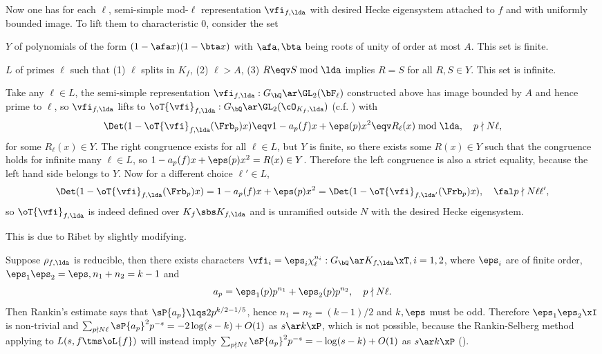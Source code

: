 \documentclass[article, a4paper, twoside]{universal}
\begin{document}
\begin{prf}
	Now one has for each $\ell$, semi-simple mod-$\ell$ representation $\vfi_{f,\lda}$ with desired Hecke eigensystem attached to $f$ and with uniformly bounded image. To lift them to characteristic $0$, consider the set
	\begin{itm}
		\item $Y$ of polynomials of the form $(1-\afa x)(1-\bta x)$ with $\afa,\bta$ being roots of unity of order at most $A$. This set is finite.
		\item $L$ of primes $\ell$ such that (1) $\ell$ splits in $K_{f}$, (2) $\ell>A$, (3) $R\eqv S\bmod{\lda}$ implies $R=S$ for all $R,S\in Y$. This set is infinite.
	\end{itm}
	Take any $\ell\in L$, the semi-simple representation $\vfi_{f,\lda}:G_{\bQ}\ar\GL_{2}(\bF_{\ell})$ constructed above has image bounded by $A$ and hence prime to $\ell$, so $\vfi_{f,\lda}$ lifts to $\oT{\vfi}_{f,\lda}:G_{\bQ}\ar\GL_{2}(\cO_{K_{f},\lda})$ (c.f. \cite[4.4]{Feit1967}) with
	\[
		\Det(1-\oT{\vfi}_{f,\lda}(\Frb_{p})x)\eqv1-a_{p}(f)x+\eps(p)x^{2}\eqv R_{\ell}(x)\bmod{\lda},\quad p\nmid N\ell,
	\]
	for some $R_{\ell}(x)\in Y$. The right congruence exists for all $\ell\in L$, but $Y$ is finite, so there exists some $R(x)\in Y$ such that the congruence holds for infinite many $\ell\in L$, so $1-a_{p}(f)x+\eps(p)x^{2}=R(x)\in Y$. Therefore the left congruence is also a strict equality, because the left hand side belongs to $Y$. Now for a different choice $\ell'\in L$,
	\[
		\Det(1-\oT{\vfi}_{f,\lda}(\Frb_{p})x)=1-a_{p}(f)x+\eps(p)x^{2}=\Det(1-\oT{\vfi}_{f,\lda'}(\Frb_{p})x),\quad \fal p\nmid N\ell\ell',
	\]
	so $\oT{\vfi}_{f,\lda}$ is indeed defined over $K_{f}\sbs K_{f,\lda}$ and is unramified outside $N$ with the desired Hecke eigensystem.


	 This is due to Ribet\cite[2.3]{Ribet1977} by slightly modifying\cite[8.7]{DS1974}.

	Suppose $\rho_{f,\lda}$ is reducible, then there exists characters $\vfi_{i}=\eps_{i}\chi_{\ell}^{n_{i}}:G_{\bQ}\ar K_{f,\lda}\xT, i=1,2$, where $\eps_{i}$ are of finite order, $\eps_{1}\eps_{2}=\eps, n_{1}+n_{2}=k-1$ and
	\[
		a_{p}=\eps_{1}(p)p^{n_{1}}+\eps_{2}(p)p^{n_{2}},\quad p\nmid N\ell.
	\]
	Then Rankin's estimate says that $\sP{a_{p}}\lqs2p^{k/2-1/5}$, hence $n_{1}=n_{2}=(k-1)/2$ and $k,\eps$ must be odd. Therefore $\eps_{1}\eps_{2}\xI$ is non-trivial and $\sum_{p\nmid N\ell}\sP{a_{p}}^{2}p^{-s}=-2\log(s-k)+O(1)$ as $s\ar k\xP$, which is not possible, because the Rankin-Selberg method applying to $L(s,f\tms\oL{f})$ will instead imply $\sum_{p\nmid N\ell}\sP{a_{p}}^{2}p^{-s}=-\log(s-k)+O(1)$ as $s\ar k\xP$ (\cite[5.1]{DS1974}).
\end{prf}
\end{document}
